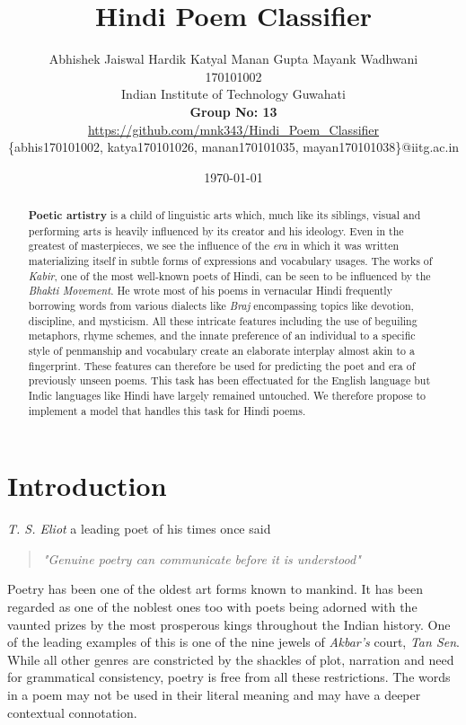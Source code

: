 \documentclass[11pt,a4paper]{article}
\title{Hindi Poem Classifier}
\author{Abhishek Jaiswal 
  \qquad\quad
  Hardik Katyal
  \quad\quad
  Manan Gupta
  \qquad
  Mayank Wadhwani \\
  170101002   \quad\quad  \quad\quad 170101026 \quad\quad\quad\quad 170101035 \quad\quad\quad\quad 170101038\\ 
  Indian Institute of Technology Guwahati \\
  \textbf{Group No: 13}\\
  \url{https://github.com/mnk343/Hindi_Poem_Classifier}\\
  \{abhis170101002, katya170101026, manan170101035, mayan170101038\}@iitg.ac.in \\}
\date{\today}
\begin{document}
	
\maketitle
\begin{abstract}
\textbf{Poetic artistry} is a child of linguistic arts which, much like its siblings, visual and performing arts is heavily influenced by its creator and his ideology. Even in the greatest of masterpieces, we see the influence of the \textit{era} in which it was written materializing itself in subtle forms of expressions and vocabulary usages.
The works of \textit{Kabir}, one of the most well-known poets of Hindi, can be seen to be influenced by the \textit{Bhakti Movement}. He wrote most of his poems in vernacular Hindi frequently borrowing words from various dialects like \textit{Braj} encompassing topics like devotion, discipline, and mysticism.
All these intricate features including the use of beguiling metaphors, rhyme schemes, and the innate preference of an individual to a specific style of penmanship and vocabulary create an elaborate interplay almost akin to a fingerprint. These features can therefore be used for predicting the poet and era of previously unseen poems. This task has been effectuated for the English language but Indic languages like Hindi have largely remained untouched. We therefore propose to implement a model that handles this task for Hindi poems.
\end{abstract}


\section{Introduction}

\textit{T. S. Eliot} a leading poet of his times once said 
\begin{quote}
    \textit{"Genuine poetry can communicate before it is understood"}
\end{quote}

Poetry has been one of the oldest art forms known to mankind. It has been regarded as one of the noblest ones too with poets being adorned with the vaunted prizes by the most prosperous kings throughout the Indian history. One of the leading examples of this is one of the nine jewels of \textit{Akbar's} court, \textit{Tan Sen}. While all other genres are constricted by the shackles of plot, narration and need for grammatical consistency, poetry is free from all these restrictions. The words in a poem may not be used in their literal meaning and may have a deeper contextual connotation. 
\end{document}
